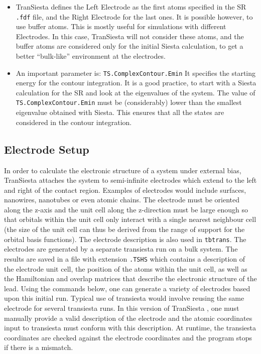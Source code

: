 \documentclass[11pt]{article}
\begin{document}
\begin{itemize}
\item
{\sc TranSiesta} defines the Left Electrode as the first atoms specified
in the SR {\tt .fdf} file, and the Right Electrode for the last ones. It is
possible however, to use buffer atoms. This is mostly useful for
simulations with different Electrodes. In this case, {\sc TranSiesta} will
not consider these atoms, and the buffer atoms are considered only for
the initial {\sc Siesta} calculation, to get a better ``bulk-like''
environment at the electrodes.

\item
An important parameter is:  {\tt TS.ComplexContour.Emin}
It specifies the starting energy for the contour integration. It is a
good practice, to start with a {\sc Siesta} calculation for the SR and look
at the eigenvalues of the system. The value of
{\tt TS.ComplexContour.Emin} must be (considerably) lower than the
smallest eigenvalue obtained with {\sc Siesta}. This ensures that all the
states are considered in the contour integration.
\end{itemize}

\subsection{Electrode Setup}

In order to calculate the electronic structure of a system under 
external bias, {\sc TranSiesta} attaches the system to semi-infinite 
electrodes which extend to the left and right of the contact region. Examples 
of electrodes would include surfaces, nanowires, nanotubes or even atomic 
chains. The electrode must be oriented along the z-axis and the unit cell 
along the z-direction must be large enough so that orbitals within the 
unit cell only interact with a single nearest neighbour cell (the size 
of the unit cell can thus be derived from the range of support for the 
orbital basis functions). The electrode description is also used in {\tt tbtrans}.
The electrodes are generated by a separate transiesta run on a bulk system. 
The results are saved in a file with extension {\tt .TSHS} which contains a 
description of the electrode unit cell, the position of the atoms within 
the unit cell, as well as the Hamiltonian and overlap matrices that describe 
the electronic structure of the lead. Using the commands below, one can 
generate a variety of electrodes based upon this initial run. Typical 
use of transiesta would involve reusing the same electrode for several 
transiesta runs. 
In this version of {\sc TranSiesta} , one must manually provide a valid 
description of the electrode and the atomic coordinates input to transiesta 
must conform with this description. At runtime, the transiesta coordinates 
are checked against the electrode coordinates and the program stops if 
there is a mismatch.
\end{document}

